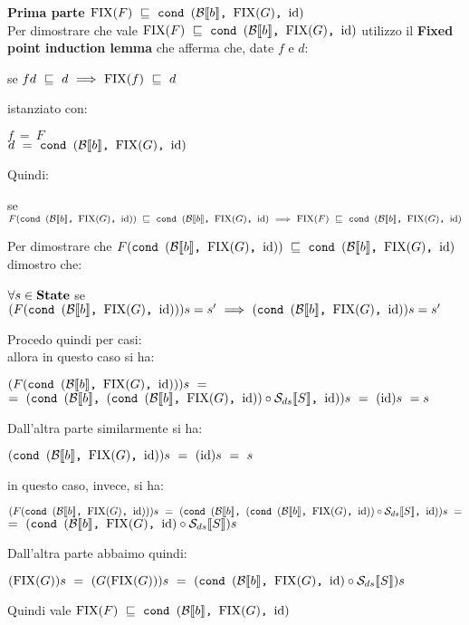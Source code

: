 {    \textbf{Prima parte $\fixp{F}~\mineq~\cond{b}{\fixp{G}}{\idDS}$}\\
    Per dimostrare che vale $\fixp{F}~\mineq~\cond{b}{\fixp{G}}{\idDS}$
    utilizzo il \textbf{Fixed point induction lemma} che afferma
    che, date $f$ e $d$:
    \begin{center}
    se $fd~\mineq~d~\Longrightarrow~\fixp{f}~\mineq~d$
    \end{center}
    istanziato con:
    \begin{center}
    $f~=~F$ \\
    $d~=~\cond{b}{\fixp{G}}{\idDS}$
    \end{center}
    Quindi:
    \begin{center}
    se $F(\cond{b}{\fixp{G}}{\idDS})~\mineq~\cond{b}{\fixp{G}}{\idDS}~
    \Longrightarrow~\fixp{F}~\mineq~\cond{b}{\fixp{G}}{\idDS}$
    \end{center}
    Per dimostrare che $F(\cond{b}{\fixp{G}}{\idDS})~\mineq~
    \cond{b}{\fixp{G}}{\idDS}$ dimostro che:
    \begin{center}
    $\forall{} s\in\states$ se $(F(\cond{b}{\fixp{G}}{\idDS}))s=s'~
    \Longrightarrow~(\cond{b}{\fixp{G}}{\idDS})s=s'$
    \end{center}
    Procedo quindi per casi:\\
     allora in questo caso si ha:
    \begin{center}
    $(F(\cond{b}{\fixp{G}}{\idDS}))s~=$\\$=~
    (\cond{b}{(\cond{b}{\fixp{G}}{\idDS}) \circ{} \Sds{}}{\idDS})s~=~
    (\idDS)s~=s$
    \end{center}
    Dall'altra parte similarmente si ha:
    \begin{center}
    $(\cond{b}{\fixp{G}}{\idDS})s~=~(\idDS)s~=~s$
    \end{center}
     in questo caso, invece, si ha:
    \begin{center}
    $(F(\cond{b}{\fixp{G}}{\idDS}))s~=~(\cond{b}{(\cond{b}{\fixp{G}}{\idDS})
    \circ{} \Sds{}}{\idDS})s~=$\\$=~(\cond{b}{\fixp{G}}{\idDS} \circ{} \Sds{})s$
    \end{center}
    Dall'altra parte abbaimo quindi:
    \begin{center}
    $(\fixp{G})s~=~(G(\fixp{G}))s~=~(\cond{b}{\fixp{G}}{\idDS} \circ \Sds)s$
    \end{center}
    Quindi vale $\fixp{F}~\mineq~\cond{b}{\fixp{G}}{\idDS}$

}
